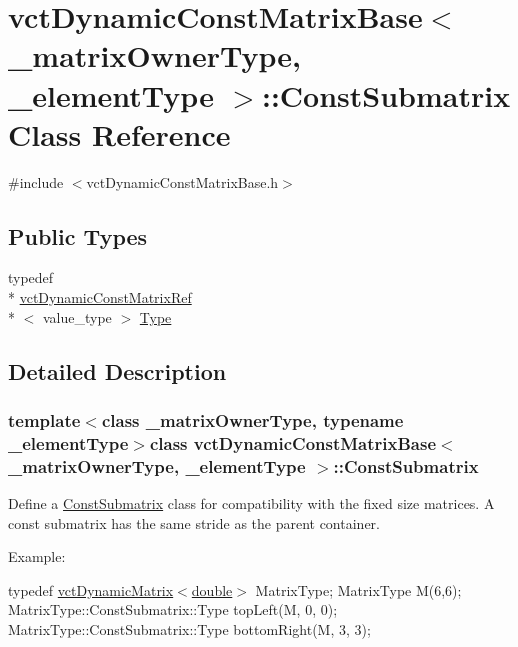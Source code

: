 \hypertarget{classvct_dynamic_const_matrix_base_1_1_const_submatrix}{\section{vct\-Dynamic\-Const\-Matrix\-Base$<$ \-\_\-matrix\-Owner\-Type, \-\_\-element\-Type $>$\-:\-:Const\-Submatrix Class Reference}
\label{classvct_dynamic_const_matrix_base_1_1_const_submatrix}
}


{\ttfamily \#include $<$vct\-Dynamic\-Const\-Matrix\-Base.\-h$>$}

\subsection*{Public Types}
\begin{DoxyCompactItemize}
\item 
typedef \\*
\hyperlink{classvct_dynamic_const_matrix_ref}{vct\-Dynamic\-Const\-Matrix\-Ref}\\*
$<$ value\-\_\-type $>$ \hyperlink{classvct_dynamic_const_matrix_base_1_1_const_submatrix_afbad836196476a7943c76d9a4fc69e28}{Type}
\end{DoxyCompactItemize}


\subsection{Detailed Description}
\subsubsection*{template$<$class \-\_\-matrix\-Owner\-Type, typename \-\_\-element\-Type$>$class vct\-Dynamic\-Const\-Matrix\-Base$<$ \-\_\-matrix\-Owner\-Type, \-\_\-element\-Type $>$\-::\-Const\-Submatrix}

Define a \hyperlink{classvct_dynamic_const_matrix_base_1_1_const_submatrix}{Const\-Submatrix} class for compatibility with the fixed size matrices. A const submatrix has the same stride as the parent container.

Example\-:

typedef \hyperlink{classvct_dynamic_matrix}{vct\-Dynamic\-Matrix$<$double$>$} Matrix\-Type; Matrix\-Type M(6,6); Matrix\-Type\-::\-Const\-Submatrix\-::\-Type top\-Left(\-M, 0, 0); Matrix\-Type\-::\-Const\-Submatrix\-::\-Type bottom\-Right(\-M, 3, 3);

